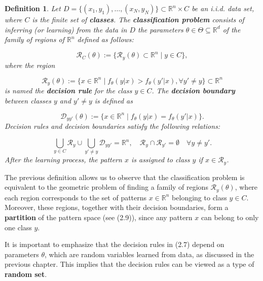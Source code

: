 \documentclass{report}
\newtheorem{definition}{Definition}[chapter]
\begin{document}
\begin{definition}
Let $D = \{(x_1,y_1),\dots,(x_N,y_N)\} \subset \mathbb{R}^n \times C$ be an i.i.d. data set, where $C$ is the finite set of \textbf{classes}. The \textbf{classification problem} consists of inferring (or learning) from the data in $D$ the parameters $\theta \in \Theta \subseteq \mathbb{R}^d$ of the family of regions of $\mathbb{R}^n$ defined as follows:

\begin{equation}
\mathcal{R}_C(\theta) := \{\mathcal{R}_y(\theta) \subset \mathbb{R}^n \mid y \in C\},
\end{equation}
where the region

\begin{equation}
\mathcal{R}_y(\theta) := \{x \in \mathbb{R}^n \mid f_\theta(y|x) > f_\theta(y'|x), \forall y' \neq y\} \subset \mathbb{R}^n
\end{equation}
is named the \textbf{decision rule} for the class $y \in C$. The \textbf{decision boundary} between classes $y$ and $y' \neq y$ is defined as

\begin{equation}
\mathcal{D}_{yy'}(\theta) := \{x \in \mathbb{R}^n \mid f_\theta(y|x) = f_\theta(y'|x)\}.
\end{equation}
Decision rules and decision boundaries satisfy the following relations:

\begin{equation}
\bigcup_{y \in C} \mathcal{R}_y \cup \bigcup_{y' \neq y} \mathcal{D}_{yy'} = \mathbb{R}^n, \quad \mathcal{R}_y \cap \mathcal{R}_{y'} = \emptyset \quad \forall y \neq y'.
\end{equation}
After the learning process, the pattern $x$ is assigned to class $y$ if $x \in \mathcal{R}_y$.
\end{definition}
The previous definition allows us to observe that the classification problem is equivalent to the geometric problem of finding a family of regions $\mathcal{R}_y(\theta)$, where each region corresponds to the set of patterns $x \in \mathbb{R}^n$ belonging to class $y \in C$. Moreover, these regions, together with their decision boundaries, form a \textbf{partition} of the pattern space (see (2.9)), since any pattern $x$ can belong to only one class $y$.

It is important to emphasize that the decision rules in (2.7) depend on parameters $\theta$, which are random variables learned from data, as discussed in the previous chapter. This implies that the decision rules can be viewed as a type of \textbf{random set}.
\end{document}
